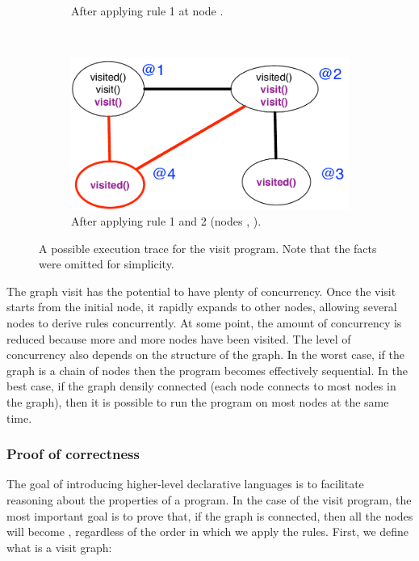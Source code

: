 \begin{figure}[h]
\begin{subfigure}[b]{0.45\textwidth}
                \caption{After applying rule 1 at node .}
                \label{fig:exec_trace3}
        \end{subfigure}%
        ~ %
        \begin{subfigure}[b]{0.45\textwidth}
                  \includegraphics[width=\textwidth]{figures/visit/trace4}
                  \caption{After applying rule 1 and 2 (nodes ,
                        ).}
                  \label{fig:exec_trace4}
          \end{subfigure}
        \caption{A possible execution trace for the visit
           program. Note that the  facts were omitted for simplicity.}
        \label{fig:exec_trace}
\end{figure}

The graph visit has the potential to have plenty of concurrency. Once the visit
starts from the initial node, it rapidly expands to other nodes, allowing
several nodes to derive rules concurrently. At some point, the amount of
concurrency is reduced because more and more nodes have been visited. The level
of concurrency also depends on the structure of the graph. In the worst case, if
the graph is a chain of nodes then the program becomes effectively sequential.
In the best case, if the graph densily connected (each node connects to most
nodes in the graph), then it is possible to run the program on most nodes at the
same time.

\subsubsection{Proof of correctness}

The goal of introducing higher-level declarative languages is to facilitate
reasoning about the properties of a program. In the case of the visit program,
the most important goal is to prove that, if the graph is connected, then all
the nodes will become , regardless of the order in which we apply
the rules. First, we define what is a visit graph:

